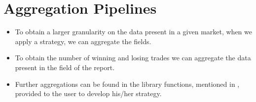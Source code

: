 \section{Aggregation Pipelines}\label{sec:aggregations}

\begin{itemize}
	\item To obtain a larger granularity on the data present in a given
		market, when we apply a strategy, we can aggregate the
		 fields.
	\item To obtain the number of winning and losing trades we can aggregate
		the data present in the  field of the report.
	\item Further aggregations can be found in the library functions,
		mentioned in , provided to the user to develop
		his/her strategy.
\end{itemize}
